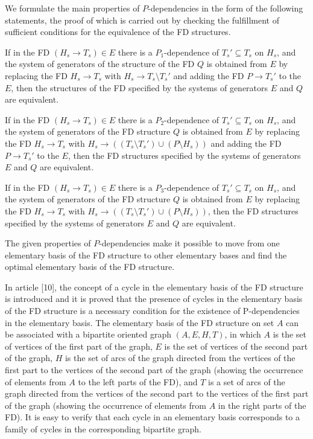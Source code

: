 \documentclass{scndocument}
\begin{document}
{We formulate the main properties of $P$-dependencies in the form of the following statements, the proof of which is carried out by checking the fulfillment of sufficient conditions for the equivalence of the FD structures.}

{If in the FD $(H_s \to T_s) \in E$ there is a $P_1$-dependence of $T_s' \subseteq T_s$ on $H_s$, and the system of generators of the structure of the FD $Q$ is obtained from $E$ by replacing the FD $H_s \to T_s$ with $H_s \to T_s \setminus T_s'$ and adding the FD $P \to T_s'$ to the $E$, then the structures of the FD specified by the systems of generators $E$ and $Q$ are equivalent.}

{If in the FD $(H_s \to T_s) \in E$ there is a $P_2$-dependence of $T_s' \subseteq T_s$ on $H_s$, and the system of generators of the FD structure $Q$ is obtained from $E$ by replacing the FD $H_s \to T_s$ with $H_s \to ((T_s \setminus T_s') \cup (P \setminus H_s))$ and adding the FD $P \to T_s'$ to the $E$, then the FD structures specified by the systems of generators $E$ and $Q$ are equivalent.}

{If in the FD $(H_s \to T_s) \in E$ there is a $P_3$-dependence of $T_s' \subseteq T_s$ on $H_s$, and the system of generators of the FD structure $Q$ is obtained from $E$ by replacing the FD $H_s \to T_s$ with $H_s \to ((T_s \setminus T_s') \cup (P \setminus H_s))$, then the FD structures specified by the systems of generators $E$ and $Q$ are equivalent.}

{The given properties of $P$-dependencies make it possible to move from one elementary basis of the FD structure to other elementary bases and find the optimal elementary basis of the FD structure.}

{In article [10], the concept of a cycle in the elementary basis of the FD structure is introduced and it is proved that the presence of cycles in the elementary basis of the FD structure is a necessary condition for the existence of P-dependencies in the elementary basis. The elementary basis of the FD structure on set $A$ can be associated with a bipartite oriented graph $(A, E, H, T)$, in which $A$ is the set of vertices of the first part of the graph, $E$ is the set of vertices of the second part of the graph, $H$ is the set of arcs of the graph directed from the vertices of the first part to the vertices of the second part of the graph (showing the occurrence of elements from $A$ to the left parts of the FD), and $T$ is a set of arcs of the graph directed from the vertices of the second part to the vertices of the first part of the graph (showing the occurrence of elements from $A$ in the right parts of the FD). It is easy to verify that each cycle in an elementary basis corresponds to a family of cycles in the corresponding bipartite graph.}
\end{document}

